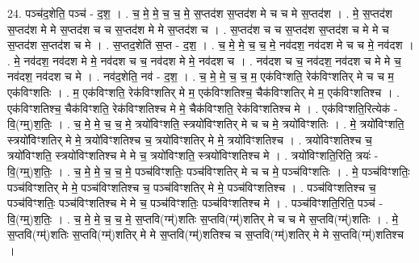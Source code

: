 \documentclass[17pt]{extarticle}
\begin{document}
24. पञ्च॑द॒शेति॒ पञ्च॑ - द॒श॒ । . च॒ मे॒ मे॒ च॒ च॒ मे॒ स॒प्तद॑श स॒प्तद॑श मे च च मे स॒प्तद॑श । . मे॒ स॒प्तद॑श स॒प्तद॑श मे मे स॒प्तद॑श च च स॒प्तद॑श मे मे स॒प्तद॑श च । . स॒प्तद॑श च च स॒प्तद॑श स॒प्तद॑श च मे मे च स॒प्तद॑श स॒प्तद॑श च मे । . स॒प्तद॒शेति॑ स॒प्त - द॒श॒ । . च॒ मे॒ मे॒ च॒ च॒ मे॒ नव॑दश॒ नव॑दश मे च च मे॒ नव॑दश । . मे॒ नव॑दश॒ नव॑दश मे मे॒ नव॑दश च च॒ नव॑दश मे मे॒ नव॑दश च । . नव॑दश च च॒ नव॑दश॒ नव॑दश च मे मे च॒ नव॑दश॒ नव॑दश च मे । . नव॑द॒शेति॒ नव॑ - द॒श॒ । . च॒ मे॒ मे॒ च॒ च॒ म॒ एक॑विꣳशति॒ रेक॑विꣳशतिर् मे च च म॒ एक॑विꣳशतिः । . म॒ एक॑विꣳशति॒ रेक॑विꣳशतिर् मे म॒ एक॑विꣳशतिश्च॒ चैक॑विꣳशतिर् मे म॒ एक॑विꣳशतिश्च । . एक॑विꣳशतिश्च॒ चैक॑विꣳशति॒ रेक॑विꣳशतिश्च मे मे॒ चैक॑विꣳशति॒ रेक॑विꣳशतिश्च मे । . एक॑विꣳशति॒रित्येक॑ - वि॒(ग्म्॒)श॒तिः॒ । . च॒ मे॒ मे॒ च॒ च॒ मे॒ त्रयो॑विꣳशति॒ स्त्रयो॑विꣳशतिर् मे च च मे॒ त्रयो॑विꣳशतिः । . मे॒ त्रयो॑विꣳशति॒ स्त्रयो॑विꣳशतिर् मे मे॒ त्रयो॑विꣳशतिश्च च॒ त्रयो॑विꣳशतिर् मे मे॒ त्रयो॑विꣳशतिश्च । . त्रयो॑विꣳशतिश्च च॒ त्रयो॑विꣳशति॒ स्त्रयो॑विꣳशतिश्च मे मे च॒ त्रयो॑विꣳशति॒ स्त्रयो॑विꣳशतिश्च मे । . त्रयो॑विꣳशति॒रिति॒ त्रयः॑ - वि॒(ग्म्॒)श॒तिः॒ । . च॒ मे॒ मे॒ च॒ च॒ मे॒ पञ्च॑विꣳशतिः॒ पञ्च॑विꣳशतिर् मे च च मे॒ पञ्च॑विꣳशतिः । . मे॒ पञ्च॑विꣳशतिः॒ पञ्च॑विꣳशतिर् मे मे॒ पञ्च॑विꣳशतिश्च च॒ पञ्च॑विꣳशतिर् मे मे॒ पञ्च॑विꣳशतिश्च । . पञ्च॑विꣳशतिश्च च॒ पञ्च॑विꣳशतिः॒ पञ्च॑विꣳशतिश्च मे मे च॒ पञ्च॑विꣳशतिः॒ पञ्च॑विꣳशतिश्च मे । . पञ्च॑विꣳशति॒रिति॒ पञ्च॑ - वि॒(ग्म्॒)श॒तिः॒ । . च॒ मे॒ मे॒ च॒ च॒ मे॒ स॒प्तवि(ग्म्॑)शतिः स॒प्तवि(ग्म्॑)शतिर् मे च च मे स॒प्तवि(ग्म्॑)शतिः । . मे॒ स॒प्तवि(ग्म्॑)शतिः स॒प्तवि(ग्म्॑)शतिर् मे मे स॒प्तवि(ग्म्॑)शतिश्च च स॒प्तवि(ग्म्॑)शतिर् मे मे स॒प्तवि(ग्म्॑)शतिश्च । \newline
\end{document}
